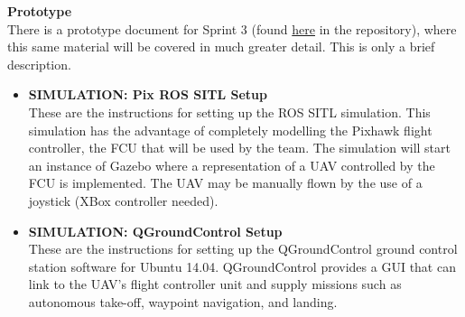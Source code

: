 \vspace{6mm}
\noindent\Large{\textbf{Prototype}}\\
\normalsize
There is a prototype document for Sprint 3 (found \href{https://github.com/SDSMT-CSC464-F15/landingpad/tree/master/Documents/Prototypes/Sprint_3}{here} in the repository), where this same material will be covered in much greater detail. This is only a brief description.
\begin{itemize}
\item \textbf{SIMULATION: Pix ROS SITL Setup}\\
These are the instructions for setting up the ROS SITL simulation. This simulation has the advantage of completely modelling the Pixhawk flight controller, the FCU that will be used by the team. The simulation will start an instance of Gazebo where a representation of a UAV controlled by the FCU is implemented. The UAV may be manually flown by the use of a joystick (XBox controller needed). 
\item \textbf{SIMULATION: QGroundControl Setup} \\
These are the instructions for setting up the QGroundControl ground control station software for Ubuntu 14.04. QGroundControl provides a GUI that can link to the UAV's flight controller unit and supply missions such as autonomous take-off, waypoint navigation, and landing.  

\end{itemize}